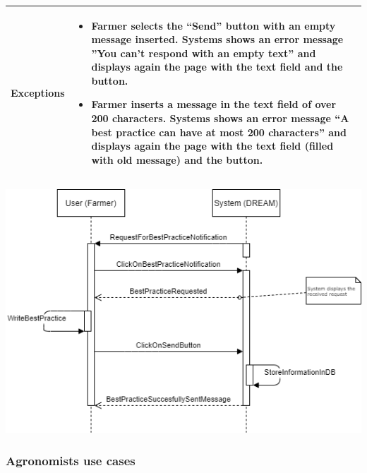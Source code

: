 \documentclass{article}
\begin{document}
\begin{center}
\begin{longtable}{|c| p{10cm}|}
        \hline
            Exceptions & \begin{itemize}
                            \item Farmer selects the “Send” button with an empty message inserted. Systems shows an error message ”You can’t respond with an empty text” and displays again the page with the text field and the button.
                            \item Farmer inserts a message in the text field of over 200 characters. Systems shows an error message “A best practice can have at most 200 characters” and displays again the page with the text field (filled with old message) and the button.
                        \end{itemize}\\
        \hline
    \end{longtable}
    
    \newpage
    
    \includegraphics[width=1.0\textwidth]{images/sequenceDiagrams/12. FarmerInsertBestPractice.png}
    \par
    \caption{\label{fig:frog}Farmer inserts “Best Practices”}

    \newpage
    
\end{center} 



\subsubsection{Agronomists use cases}
\end{document}
